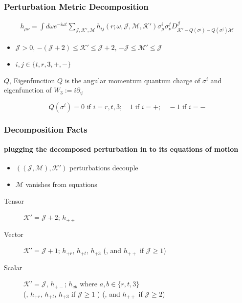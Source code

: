 \documentclass[aspectratio=169, xcolor=dvipsnames]{beamer}
\begin{document}
\begin{frame}
  \frametitle{Perturbation Metric Decomposition}

  \begin{align*}
    h_{\mu\nu} = \int d\omega e^{-i\omega t} \sum_{\mathcal{J}, \mathcal{K}', \mathcal{M}} h_{i j}(r;\omega,\mathcal{J},\mathcal{M},\mathcal{K}') \sigma^i_{\mu} \sigma^j_{\nu} D_{\mathcal{K'}-Q(\sigma^{i})-Q(\sigma^{j}) \mathcal{M}}^\mathcal{J}
  \end{align*}

  \begin{itemize}
    \item $\mathcal{J} > 0$, $-\left( \mathcal J + 2 \right) \leq \mathcal{K}' \leq \mathcal J + 2$, $-\mathcal J \leq \mathcal{M}'  \leq \mathcal J$
    \item $i, j \in \{t,r,3,+, -\}$
  \end{itemize}

  \begin{block}{$Q$, Eigenfunction}
    \alert{$Q$} is the angular momentum quantum charge of $\sigma^i$ and eigenfunction of $W_3 := i\partial_\psi$

    \begin{equation*}
      Q(\sigma^i) = 0 \text{ if } i=r,t,3;\quad 1 \text{ if } i=+;\quad -1 \text{ if } i=- 
    \end{equation*}
  \end{block}

\end{frame}

\begin{frame}
  \frametitle{Decomposition Facts}
  \framesubtitle{plugging the decomposed perturbation in to its equations of motion}

  \begin{itemize}
    \item $((\mathcal J, \mathcal M), \mathcal K')$ perturbations decouple
    \item $\mathcal M$ vanishes from equations
  \end{itemize}

  \vfill

  \begin{description}
    \item[Tensor]
      \(\mathcal K' = \mathcal J + 2\); \(h_{++}\)
    \item[Vector]
      \(\mathcal K' = \mathcal J + 1\); \(h_{+r}\), \(h_{+t}\), \(h_{+3}\) (,
      and \(h_{++}\) if \(\mathcal J \geq 1\))
    \item[Scalar]
      \(\mathcal K' = \mathcal J\), \(h_{+-}\); \(h_{ab}\) where
      \(a,b \in \{r,t,3\}\)\\
      (, \(h_{+r}\), \(h_{+t}\), \(h_{+3}\) if \(\mathcal J \geq 1\) ) (, and
      \(h_{++}\) if \(\mathcal J \geq 2\))
  \end{description}
\end{frame}
\end{document}
